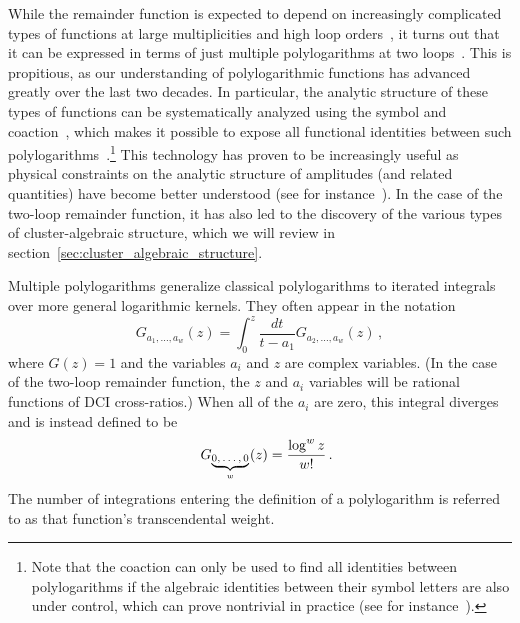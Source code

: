 \documentclass[11pt]{article}
\newcommand{\fwboxL}[2]{\text{\makebox[#1][l]{$#2$}}}
\begin{document}
While the remainder function is expected to depend on increasingly complicated types of functions at large multiplicities and high loop orders~\cite{Paulos:2012nu,CaronHuot:2012ab,Nandan:2013ip,Chicherin:2017bxc,Bourjaily:2017bsb,Bourjaily:2018ycu,Bourjaily:2018yfy,Bourjaily:2019hmc}, it turns out that it can be expressed in terms of just multiple polylogarithms at two loops~\cite{CaronHuot:2011ky}. This is propitious, as our understanding of polylogarithmic functions has advanced greatly over the last two decades. In particular, the analytic structure of these types of functions can be systematically analyzed using the symbol and coaction~\cite{Goncharov:2001iea,Brown:2009qja,Goncharov:2010jf,Brown1102.1312,Brown:2015fyf}, which makes it possible to expose all functional identities between such polylogarithms~\cite{Goncharov:2005sla,2011arXiv1101.4497D,Brown:2011ik,Duhr:2011zq,Duhr:2012fh}.\footnote{Note that the coaction can only be used to find all identities between polylogarithms if the algebraic identities between their symbol letters are also under control, which can prove nontrivial in practice (see for instance~\cite{Bourjaily:2019igt}).} This technology has proven to be increasingly useful as physical constraints on the analytic structure of amplitudes (and related quantities) have become better understood (see for instance~\cite{Bloch:2010gk,Abreu:2014cla,Bloch:2015efx,Abreu:2017ptx,Caron-Huot:2019bsq,Bourjaily:2019exo,Bourjaily:2020wvq,Benincasa:2020aoj}). In the case of the two-loop remainder function, it has also led to the discovery of the various types of cluster-algebraic structure, which we will review in section~\ref{sec:cluster_algebraic_structure}. 

Multiple polylogarithms generalize classical polylogarithms to iterated integrals over more general logarithmic kernels. They often appear in the notation
\begin{equation} \label{eq:G_notation}
G_{a_1,\dots, a_w}(z) = \int_0^z \frac{dt}{t-a_1} G_{a_2,\dots, a_w}(z)\, ,
\end{equation}
where $G(z) = 1$ and the variables $a_i$ and $z$ are complex variables. (In the case of the two-loop remainder function, the $z$ and $a_i$ variables will be rational functions of DCI cross-ratios.) When all of the $a_i$ are zero, this integral diverges and is instead defined to be
\begin{equation}
\quad G_{\fwboxL{27pt}{{\underbrace{0,\dots,0}_{w}}}}(z) = \frac{\log^w z}{w!} \, .
\end{equation}
The number of integrations entering the definition of a polylogarithm is referred to as that function's transcendental weight. 
\end{document}
